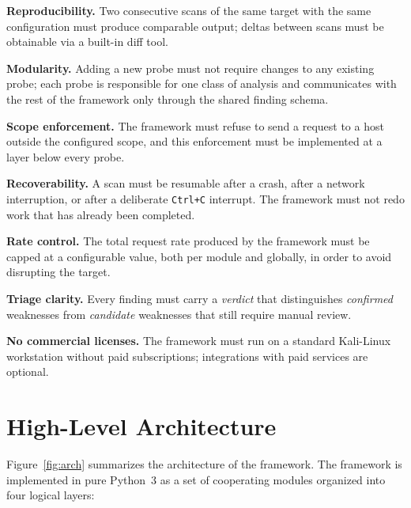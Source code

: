 \begin{description}[style=multiline, leftmargin=1.5cm, labelwidth=1.3cm]
  \item[N1.]  \textbf{Reproducibility.} Two consecutive scans of the same target with the same configuration must produce comparable output; deltas between scans must be obtainable via a built-in diff tool.
  \item[N2.]  \textbf{Modularity.} Adding a new probe must not require changes to any existing probe; each probe is responsible for one class of analysis and communicates with the rest of the framework only through the shared finding schema.
  \item[N3.]  \textbf{Scope enforcement.} The framework must refuse to send a request to a host outside the configured scope, and this enforcement must be implemented at a layer below every probe.
  \item[N4.]  \textbf{Recoverability.} A scan must be resumable after a crash, after a network interruption, or after a deliberate \texttt{Ctrl+C} interrupt. The framework must not redo work that has already been completed.
  \item[N5.]  \textbf{Rate control.} The total request rate produced by the framework must be capped at a configurable value, both per module and globally, in order to avoid disrupting the target.
  \item[N6.]  \textbf{Triage clarity.} Every finding must carry a \textit{verdict} that distinguishes \textit{confirmed} weaknesses from \textit{candidate} weaknesses that still require manual review.
  \item[N7.]  \textbf{No commercial licenses.} The framework must run on a standard Kali-Linux workstation without paid subscriptions; integrations with paid services are optional.
\end{description}

\section{High-Level Architecture}

Figure~\ref{fig:arch} summarizes the architecture of the framework. The framework is implemented in pure Python~3 as a set of cooperating modules organized into four logical layers:

